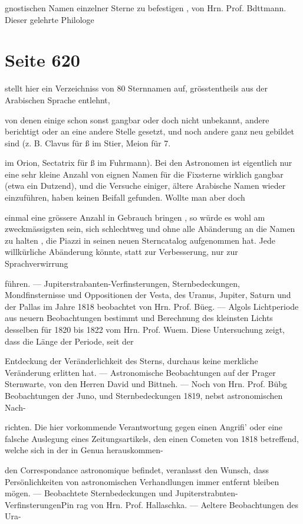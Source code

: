 \documentclass[10pt,a4paper]{article}
\begin{document}
gnostischen Namen einzelner Sterne zu befestigen , von Hrn. Prof. Bdttmann. Dieser gelehrte Philologe


\newpage
\section*{Seite 620}
stellt hier ein Verzeichniss von 80 Sternnamen auf, grösstentheils aus der Arabischen Sprache entlehnt,

von denen einige schon sonst gangbar oder doch nicht unbekannt, andere berichtigt oder an eine andere Stelle gesetzt, und noch andere ganz neu gebildet sind (z. B. Clavus für ß im Stier, Meion für 7.

im Orion, Sectatrix für ß im Fuhrmann). Bei den Astronomen ist eigentlich nur eine sehr kleine Anzahl von eignen Namen für die Fixsterne wirklich gangbar (etwa ein Dutzend), und die Versuche einiger, ältere Arabische Namen wieder einzuführen, haben keinen Beifall gefunden. Wollte man aber doch

einmal eine grössere Anzahl in Gebrauch bringen , so würde es wohl am zweckmässigsten sein, sich schlechtweg und ohne alle Abänderung an die Namen zu halten , die Piazzi in seinen neuen Sterncatalog aufgenommen hat. Jede willkürliche Abänderung könnte, statt zur Verbesserung, nur zur Sprachverwirrung

führen. — Jupiterstrabanten-Verfinsterungen, Sternbedeckungen, Mondfinsternisse und Oppositionen der Vesta, des Uranus, Jupiter, Saturn und der Pallas im Jahre 1818 beobachtet von Hrn. Prof. Büeg. — Algols Lichtperiode aus neuern Beobachtungen bestimmt und Berechnung des kleinsten Lichts desselben für 1820 bis 1822 vom Hrn. Prof. Wuem. Diese Untersuchung zeigt, dass die Länge der Periode, seit der

Entdeckung der Veränderlichkeit des Sterns, durchaus keine merkliche Veränderung erlitten hat. — Astronomische Beobachtungen auf der Prager Sternwarte, von den Herren David und Bittneh. — Noch von Hrn. Prof. Bübg Beobachtungen der Juno, und Sternbedeckungen 1819, nebst astronomischen Nach-

richten. Die hier vorkommende Verantwortung gegen einen Angrifi' oder eine falsche Auslegung eines Zeitungsartikels, den einen Cometen von 1818 betreffend, welche sich in der in Genua herauskommen-

den Correspondance astronomique befindet, veranlasst den Wunsch, dass Persönlichkeiten von astronomischen Verhandlungen immer entfernt bleiben mögen. — Beobachtete Sternbedeckungen und Jupiterstrabnten-VerfinsterungenPin rag von Hrn. Prof. Hallaschka. — Aeltere Beobachtungen des Ura-
\end{document}
